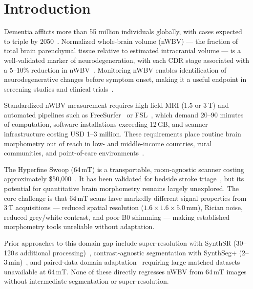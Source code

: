 \documentclass[12pt,a4paper]{article}
\begin{document}
\section{Introduction}
\label{sec:introduction}

Dementia afflicts more than 55 million individuals globally, with cases
expected to triple by 2050~\cite{who2023}. Normalized whole-brain volume
(nWBV) --- the fraction of total brain parenchymal tissue relative to
estimated intracranial volume --- is a well-validated marker of
neurodegeneration, with each CDR stage associated with a 5--10\% reduction
in nWBV~\cite{fotenos2005,buckner2004}. Monitoring nWBV enables
identification of neurodegenerative changes before symptom onset, making it a
useful endpoint in screening studies and clinical trials~\cite{jack2018nia}.

Standardized nWBV measurement requires high-field MRI (1.5 or 3\,T) and
automated pipelines such as FreeSurfer~\cite{fischl2012freesurfer} or
FSL~\cite{smith2002fsl}, which demand 20--90 minutes of computation,
software installations exceeding 12\,GB, and scanner infrastructure costing
USD 1--3 million. These requirements place routine brain morphometry out of
reach in low- and middle-income countries, rural communities, and
point-of-care environments~\cite{prince2016world}.

The Hyperfine Swoop (64\,mT) is a transportable, room-agnostic scanner
costing approximately \$50{,}000~\cite{hyperfine2021}. It has been validated
for bedside stroke triage~\cite{kimberly2023bedside}, but its potential for
quantitative brain morphometry remains largely unexplored. The core challenge
is that 64\,mT scans have markedly different signal properties from 3\,T
acquisitions --- reduced spatial resolution ($1.6\times1.6\times5.0$\,mm),
Rician noise, reduced grey/white contrast, and poor B0 shimming --- making
established morphometry tools unreliable without adaptation.

Prior approaches to this domain gap include super-resolution with SynthSR
(30--120\,s additional processing)~\cite{iglesias2023synthsr},
contrast-agnostic segmentation with SynthSeg+
(2--3\,min)~\cite{billot2023synthseg}, and paired-data domain
adaptation~\cite{chen2019synergistic} requiring large matched datasets
unavailable at 64\,mT. None of these directly regresses nWBV from 64\,mT
images without intermediate segmentation or super-resolution.
\end{document}
